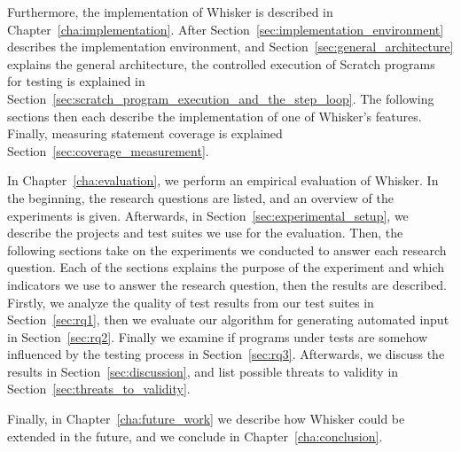 Furthermore, the implementation of Whisker is described in Chapter~\ref{cha:implementation}.
After Section~\ref{sec:implementation_environment} describes the implementation environment,
and Section~\ref{sec:general_architecture} explains the general architecture,
the controlled execution of Scratch programs for testing is explained in Section~\ref{sec:scratch_program_execution_and_the_step_loop}.
The following sections then each describe the implementation of one of Whisker's features.
Finally, measuring statement coverage is explained Section~\ref{sec:coverage_measurement}.
\parspace

In Chapter~\ref{cha:evaluation}, we perform an empirical evaluation of Whisker.
In the beginning, the research questions are listed, and an overview of the experiments is given.
Afterwards, in Section~\ref{sec:experimental_setup}, we describe the projects and test suites we use for the evaluation.
Then, the following sections take on the experiments we conducted to answer each research question.
Each of the sections explains the purpose of the experiment and which indicators we use to answer the research question,
then the results are described.
Firstly, we analyze the quality of test results from our test suites in Section~\ref{sec:rq1},
then we evaluate our algorithm for generating automated input in Section~\ref{sec:rq2}.
Finally we examine if programs under tests are somehow influenced by the testing process in Section~\ref{sec:rq3}.
Afterwards, we discuss the results in Section~\ref{sec:discussion},
and list possible threats to validity in Section~\ref{sec:threats_to_validity}.
\parspace

Finally, in Chapter~\ref{cha:future_work} we describe how Whisker could be extended in the future,
and we conclude in Chapter~\ref{cha:conclusion}.

%
